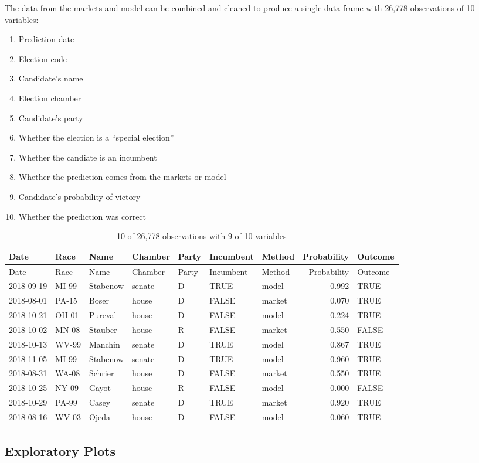 \documentclass[]{article}
\providecommand{\tightlist}{%
  \setlength{\itemsep}{0pt}\setlength{\parskip}{0pt}}
\begin{document}
The data from the markets and model can be combined and cleaned to
produce a single data frame with 26,778 observations of 10 variables:

\begin{enumerate}
\def\labelenumi{\arabic{enumi}.}
\tightlist
\item
  Prediction date
\item
  Election code
\item
  Candidate's name
\item
  Election chamber
\item
  Candidate's party
\item
  Whether the election is a ``special election''
\item
  Whether the candiate is an incumbent
\item
  Whether the prediction comes from the markets or model
\item
  Candidate's probability of victory
\item
  Whether the prediction was correct
\end{enumerate}

\begin{longtable}[]{@{}lllllllrl@{}}
\caption{10 of 26,778 observations with 9 of 10
variables}\tabularnewline
\toprule
Date & Race & Name & Chamber & Party & Incumbent & Method & Probability
& Outcome\tabularnewline
\midrule
\endfirsthead
\toprule
Date & Race & Name & Chamber & Party & Incumbent & Method & Probability
& Outcome\tabularnewline
\midrule
\endhead
2018-09-19 & MI-99 & Stabenow & senate & D & TRUE & model & 0.992 &
TRUE\tabularnewline
2018-08-01 & PA-15 & Boser & house & D & FALSE & market & 0.070 &
TRUE\tabularnewline
2018-10-21 & OH-01 & Pureval & house & D & FALSE & model & 0.224 &
TRUE\tabularnewline
2018-10-02 & MN-08 & Stauber & house & R & FALSE & market & 0.550 &
FALSE\tabularnewline
2018-10-13 & WV-99 & Manchin & senate & D & TRUE & model & 0.867 &
TRUE\tabularnewline
2018-11-05 & MI-99 & Stabenow & senate & D & TRUE & model & 0.960 &
TRUE\tabularnewline
2018-08-31 & WA-08 & Schrier & house & D & FALSE & market & 0.550 &
TRUE\tabularnewline
2018-10-25 & NY-09 & Gayot & house & R & FALSE & model & 0.000 &
FALSE\tabularnewline
2018-10-29 & PA-99 & Casey & senate & D & TRUE & market & 0.920 &
TRUE\tabularnewline
2018-08-16 & WV-03 & Ojeda & house & D & FALSE & model & 0.060 &
TRUE\tabularnewline
\bottomrule
\end{longtable}

\subsection{Exploratory Plots}\label{exploratory-plots}
\end{document}
